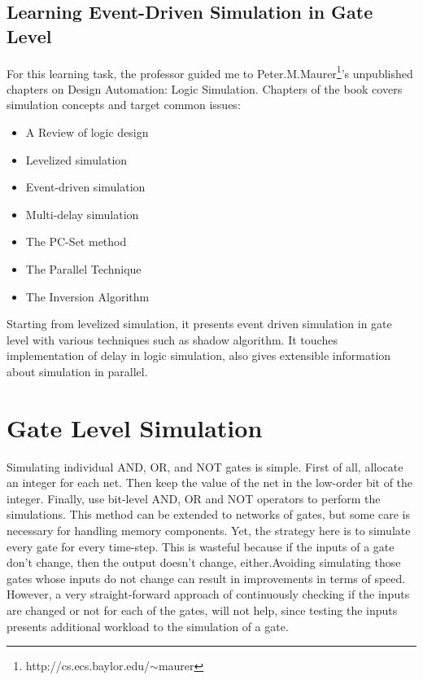 \documentclass[a4paper,onesided,12pt]{report}
\begin{document}
 \section{Learning Event-Driven Simulation in Gate Level}
 
 For this learning task, the professor guided me to Peter.M.Maurer\footnote{http://cs.ecs.baylor.edu/$\sim$maurer}'s unpublished chapters on Design Automation: Logic Simulation. Chapters of the book covers simulation concepts and target common issues:
 \begin{itemize}
 \item A Review of logic design
 \item Levelized simulation
 \item Event-driven simulation
 \item Multi-delay simulation
 \item The PC-Set method
 \item The Parallel Technique
 \item The Inversion Algorithm
 \end{itemize} 
 
 Starting from levelized simulation, it presents event driven simulation in gate level with various techniques such as shadow algorithm. It touches implementation of delay in logic simulation, also gives extensible information about simulation in parallel.
 
 \chapter{Gate Level Simulation}
 \label{chapter:gate-level-simulation}
 
 Simulating individual AND, OR, and NOT gates is simple. First of all, allocate an integer for each net. Then keep the value of the net in the low-order bit of the integer. Finally, use bit-level AND, OR and NOT operators to perform the simulations. This method can be extended to networks of gates, but some care is necessary for handling memory components. Yet, the strategy here is to simulate every gate for every time-step. This is wasteful because if the inputs of a gate don't change, then the output doesn't change, either.Avoiding simulating those gates whose inputs do not change can result in improvements in terms of speed. However, a very straight-forward approach of continuously checking if the inputs are changed or not for each of the gates, will not help, since testing the inputs presents additional workload to the simulation of a gate. 
 
\end{document}
